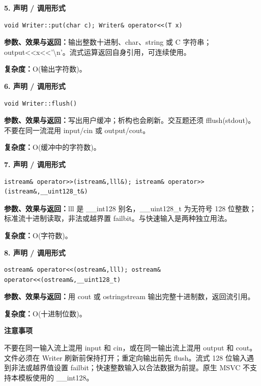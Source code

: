 \documentclass[UTF8,a4paper,10pt]{ctexart}
\newcommand{\TemplNote}[1]{\textbf{注意事项}\par #1\par}
\begin{document}
\noindent\begin{minipage}{\textwidth}
\textbf{5. 声明 / 调用形式}
\begin{lstlisting}
void Writer::put(char c); Writer& operator<<(T x)
\end{lstlisting}
\textbf{参数、效果与返回：}输出整数十进制、char、string 或 C 字符串；output<<x<<'\textbackslash{}n'。流式运算返回自身引用，可连续使用。

\textbf{复杂度：}O(输出字符数)。

\end{minipage}\par\vspace{0.4em}
\noindent\begin{minipage}{\textwidth}
\textbf{6. 声明 / 调用形式}
\begin{lstlisting}
void Writer::flush()
\end{lstlisting}
\textbf{参数、效果与返回：}写出用户缓冲；析构也会刷新。交互题还须 fflush(stdout)。不要在同一流混用 input/cin 或 output/cout。

\textbf{复杂度：}O(缓冲中的字符数)。

\end{minipage}\par\vspace{0.4em}
\noindent\begin{minipage}{\textwidth}
\textbf{7. 声明 / 调用形式}
\begin{lstlisting}
istream& operator>>(istream&,lll&); istream& operator>>(istream&,__uint128_t&)
\end{lstlisting}
\textbf{参数、效果与返回：}lll 是 \_\_int128 别名，\_\_uint128\_t 为无符号 128 位整数；标准流十进制读取，非法或越界置 failbit。与快速输入是两种独立用法。

\textbf{复杂度：}O(字符数)。

\end{minipage}\par\vspace{0.4em}
\noindent\begin{minipage}{\textwidth}
\textbf{8. 声明 / 调用形式}
\begin{lstlisting}
ostream& operator<<(ostream&,lll); ostream& operator<<(ostream&,__uint128_t)
\end{lstlisting}
\textbf{参数、效果与返回：}用 cout 或 ostringstream 输出完整十进制数，返回流引用。

\textbf{复杂度：}O(十进制位数)。

\TemplNote{不要在同一输入流上混用 input 和 cin，或在同一输出流上混用 output 和 cout。文件必须在 Writer 刷新前保持打开；重定向输出前先 flush。流式 128 位输入遇到非法或越界值设置 failbit；快速整数输入以合法数据为前提。原生 MSVC 不支持本模板使用的 \_\_int128。}
\end{minipage}\par\vspace{0.4em}
\clearpage
\end{document}
